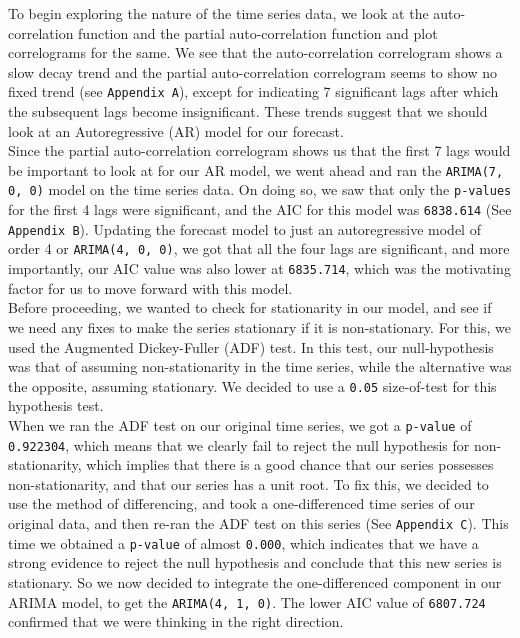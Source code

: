 \documentclass[12pt]{article}
\begin{document}
To begin exploring the nature of the time series data, we look at the auto-correlation function and the partial auto-correlation function and plot correlograms for the same. We see that the auto-correlation correlogram shows a slow decay trend and the partial auto-correlation correlogram seems to show no fixed trend (see \texttt{Appendix A}), except for indicating 7 significant lags after which the subsequent lags become insignificant. These trends suggest that we should look at an Autoregressive (AR) model for our forecast\cite{ar}.\\

Since the partial auto-correlation correlogram shows us that the first 7 lags would be important to look at for our AR model, we went ahead and ran the \texttt{ARIMA(7, 0, 0)} model on the time series data. On doing so, we saw that only the \texttt{p-values} for the first 4 lags were significant, and the AIC for this model was \texttt{6838.614} (See \texttt{Appendix B}). Updating the forecast model to just an autoregressive model of order 4 or \texttt{ARIMA(4, 0, 0)}, we got that all the four lags are significant, and more importantly, our AIC value was also lower at \texttt{6835.714}, which was the motivating factor for us to move forward with this model.\\

Before proceeding, we wanted to check for stationarity in our model, and see if we need any fixes to make the series stationary if it is non-stationary. For this, we used the Augmented Dickey-Fuller (ADF) test\cite{stationarity}. In this test, our null-hypothesis was that of assuming non-stationarity in the time series, while the alternative was the opposite, assuming stationary. We decided to use a \texttt{0.05} size-of-test for this hypothesis test.\\

When we ran the ADF test on our original time series, we got a \texttt{p-value} of \texttt{0.922304}, which means that we clearly fail to reject the null hypothesis for non-stationarity, which implies that there is a good chance that our series possesses non-stationarity, and that our series has a unit root. To fix this, we decided to use the method of differencing, and took a one-differenced time series of our original data, and then re-ran the ADF test on this series (See \texttt{Appendix C}). This time we obtained a \texttt{p-value} of almost \texttt{0.000}, which indicates that we have a strong evidence to reject the null hypothesis and conclude that this new series is stationary. So we now decided to integrate the one-differenced component in our ARIMA model, to get the \texttt{ARIMA(4, 1, 0)}. The lower AIC value of \texttt{6807.724} confirmed that we were thinking in the right direction.\\
\end{document}

